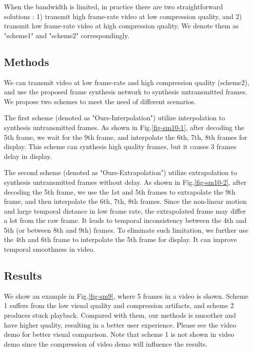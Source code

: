 \documentclass[sigconf]{acmart}
\begin{document}
When the bandwidth is limited, in practice there are two straightforward solutions : 1) transmit high frame-rate video at low compression quality, and 2) transmit low frame-rate video at high compression quality. We denote them as "scheme1" and "scheme2" correspondingly. 


\subsection{Methods}

We can transmit video at low frame-rate and high compression quality (scheme2), and use the proposed frame synthesis network to synthesis untransmitted frames. We propose two schemes to meet the need of different scenarios.

The first scheme (denoted as "Ours-Interpolation") utilize interpolation to synthesis untransmitted frames. As shown in Fig.\ref{fig-sm10-1}, after decoding the 5th frame, we wait for the 9th frame, and interpolate the 6th, 7th, 8th frames for display. This scheme can synthesis high quality frames, but it causes 3 frames delay in display.

The second scheme (denoted as "Ours-Extrapolation") utilize extrapolation to synthesis untransmitted frames without delay. As shown in Fig.\ref{fig-sm10-2}, after decoding the 5th frame, we use the 1st and 5th frames to extrapolate the 9th frame, and then interpolate the 6th, 7th, 8th frames. Since the non-linear motion and large temporal distance in low frame rate, the extrapolated frame may differ a lot from the raw frame. It leads to temporal inconsistency between the 4th and 5th (or between 8th and 9th) frames. To eliminate such limitation, we further use the 4th and 6th frame to interpolate the 5th frame for display. It can improve temporal smoothness in video.

\subsection{Results}

We show an example in Fig.\ref{fig-sm9}, where 5 frames in a video is shown. Scheme 1 suffers from the low visual quality and compression artifacts, and scheme 2 produces stuck playback. Compared with them, our methods is smoother and have higher quality, resulting in a better user experience. Please see the video demo for better visual comparison. Note that scheme 1 is not shown in video demo since the compression of video demo will influence the results.
\end{document}
